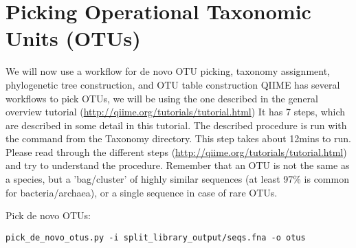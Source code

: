\section{Picking Operational Taxonomic Units (OTUs)}
We will now use a workflow for de novo OTU picking, taxonomy assignment, phylogenetic tree construction, and OTU table construction QIIME has several workflows to pick OTUs, we will be using the one described in the general overview tutorial (\url{http://qiime.org/tutorials/tutorial.html}) It has 7 steps, which are described in some detail in this tutorial. 
The described procedure is run with the command from the Taxonomy directory. This step takes about 12mins to run. Please read through the different steps (\url{http://qiime.org/tutorials/tutorial.html}) and try to understand the procedure. Remember that an OTU is not the same as a species, but a 'bag/cluster' of highly similar sequences (at least 97\% is common for bacteria/archaea), or a single sequence in case of rare OTUs.

\begin{steps}
Pick de novo OTUs:

\begin{lstlisting}
pick_de_novo_otus.py -i split_library_output/seqs.fna -o otus   
\end{lstlisting}
\end{steps}

